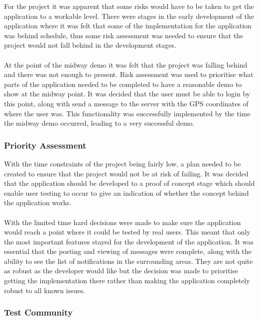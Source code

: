 For the project it was apparent that some risks would have to be taken to get the application to a workable level. There were stages in the early development of the application where it was felt that some of the implementation for the application was behind schedule, thus some risk assessment was needed to ensure that the project would not fall behind in the development stages.\\
\\
At the point of the midway demo it was felt that the project was falling behind and there was not enough to present. Risk assessment was used to prioritise what parts of the application needed to be completed to have a reasonable demo to show at the midway point. It was decided that the user must be able to login by this point, along with send a message to the server with the GPS coordinates of where the user was. This functionality was successfully implemented by the time the midway demo occurred, leading to a very successful demo.

\subsubsection{Priority Assessment}

With the time constraints of the project being fairly low, a plan needed to be created to ensure that the project would not be at risk of failing. It was decided that the application should be developed to a proof of concept stage which should enable user testing to occur to give an indication of whether the concept behind the application works.\\
\\
With the limited time hard decisions were made to make sure the application would reach a point where it could be tested by real users. This meant that only the most important features stayed for the development of the application. It was essential that the posting and viewing of messages were complete, along with the ability to see the list of notifications in the surrounding areas. They are not quite as robust as the developer would like but the decision was made to prioritise getting the implementation there rather than making the application completely robust to all known issues.

\subsubsection{Test Community}

